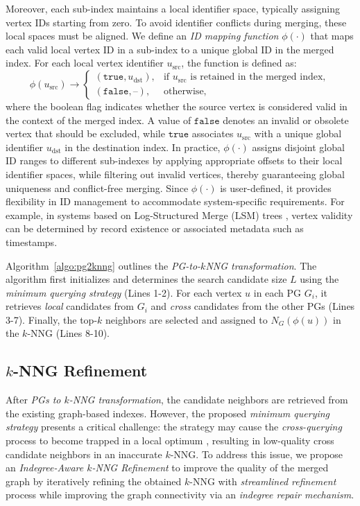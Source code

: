 \documentclass[acmsmall]{acmart}
\theoremstyle{remark}
\theoremstyle{definition}
\begin{document}
Moreover, each sub-index maintains a local identifier space, typically assigning vertex IDs starting from zero. To avoid identifier conflicts during merging, these local spaces must be aligned. We define an \emph{ID mapping function} $\phi(\cdot)$ that maps each valid local vertex ID in a sub-index to a unique global ID in the merged index. For each local vertex identifier $u_{\text{src}}$, the function is defined as:
\[
\phi(u_{\text{src}}) \rightarrow 
\begin{cases}
	(\texttt{true}, u_{\text{dst}}), & \text{if } u_{\text{src}} \text{ is retained in the merged index},\\[4pt]
	(\texttt{false}, \text{--}), & \text{otherwise,}
\end{cases}
\]
where the boolean flag indicates whether the source vertex is considered valid in the context of the merged index. A value of $\texttt{false}$ denotes an invalid or obsolete vertex that should be excluded, while $\texttt{true}$ associates $u_{\text{src}}$ with a unique global identifier $u_{\text{dst}}$ in the destination index. In practice, $\phi(\cdot)$ assigns disjoint global ID ranges to different sub-indexes by applying appropriate offsets to their local identifier spaces, while filtering out invalid vertices, thereby guaranteeing global uniqueness and conflict-free merging. Since $\phi(\cdot)$ is user-defined, it provides flexibility in ID management to accommodate system-specific requirements. For example, in systems \cite{chen2024singlestore,niu2025blendhouse,wang2021milvus} based on Log-Structured Merge (LSM) trees \cite{o1996log}, vertex validity can be determined by record existence or associated metadata such as timestamps.




Algorithm~\ref{algo:pg2knng} outlines the \textit{PG-to-$k$NNG transformation}. The algorithm first initializes and determines the search candidate size $L$ using the \textit{minimum querying strategy} (Lines 1-2). For each vertex $u$ in each PG $G_i$, it retrieves \textit{local} candidates from $G_i$ and \textit{cross} candidates from the other PGs (Lines 3-7). Finally, the top-$k$ neighbors are selected and assigned to $N_G(\phi(u))$ in the $k$-NNG (Lines 8-10).

\subsection{$k$-NNG Refinement}
\label{sec:knngrefinement}

After \textit{PGs to $k$-NNG transformation}, the candidate neighbors are retrieved from the existing graph-based indexes. However, the proposed \textit{minimum querying strategy} presents a critical challenge: the strategy may cause the \textit{cross-querying} process to become trapped in a local optimum \cite{prokhorenkova2020graph}, resulting in low-quality cross candidate neighbors in an inaccurate $k$-NNG. To address this issue, we propose an \textit{{Indegree-Aware $k$-NNG Refinement}} to improve the quality of the merged graph by iteratively refining the obtained $k$-NNG with \textit{streamlined refinement} process while improving the graph connectivity via an \textit{indegree repair mechanism}.
\end{document}
